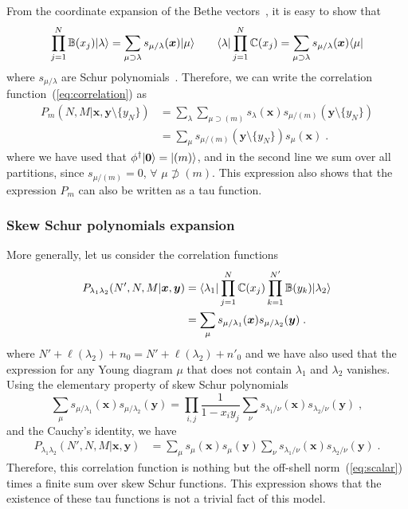 \documentclass[a4paper,11pt]{amsart}
\begin{document}
From the coordinate expansion of the Bethe
vectors~\cite{Bogoliubov2005, Tsilevich:2006}, it is easy to show that
\begin{equation}
\prod_{j=1}^N \mathbb{B}(x_j)\lvert\lambda\rangle  = \sum_{\mu \supset \lambda } s_{\mu/\lambda}(\bm{x})\lvert\mu\rangle\qquad 
 \langle\lambda\rvert \prod_{j=1}^N \mathbb{C}(x_j) = \sum_{\mu \supset \lambda } s_{\mu/\lambda}(\bm{x})\langle\mu\rvert
\end{equation}
where \(s_{\mu/\lambda}\) are Schur polynomials~\cite{Macdonald:1998}.
Therefore, we can write the correlation function~(\ref{eq:correlation}) as 
\begin{equation}
\begin{split}
  P_m(N, M|\bm{x}, \bm{y}\setminus \{y_N\})
  & = \sum_\lambda \sum_{\mu \supset (m)} s_{\lambda}(\bm{x}) s_{\mu/(m)}(\bm{y}\setminus\{y_N\})\\
  & = \sum_\mu s_{\mu/(m)}(\bm{y}\setminus\{y_N\}) s_{\mu}(\bm{x})\; .
\end{split}
\end{equation}
where we have used that \(\phi^\dagger \lvert\bm{0}\rangle = \lvert(m)\rangle\), and in the second line
we sum over all partitions, since \(s_{\mu/(m)} = 0\), \(\forall \) \(\mu \not \supset (m)\).
This expression also shows that the expression \(P_m\) can also be written as a tau function. 

\subsubsection{Skew Schur polynomials expansion}
More generally, let us consider the correlation functions 
\begin{equation}
\begin{split}
  P_{\lambda_1 \lambda_2}(N', N, M|\bm{x}, \bm{y}) & =
  \langle\lambda_1\rvert \prod_{j=1}^N \mathbb{C}(x_j)
  \prod_{k=1}^{N'} \mathbb{B}(y_k)\lvert\lambda_2\rangle \\
  & = \sum_{\mu} s_{\mu/\lambda_1}(\bm{x}) s_{\mu/\lambda_2}(\bm{y}) \; .
\end{split}
\end{equation}
where \(N' + \ell(\lambda_2) + n_0 = N' + \ell(\lambda_2) + n'_0\) and 
we have also used that the expression for any Young diagram
\(\mu\) that does not contain \(\lambda_1\) and \(\lambda_2\)
vanishes. Using the elementary property of skew Schur
polynomials~\cite{Macdonald:1998}
\begin{equation}
  \sum_{\mu} s_{\mu/\lambda_1}(\bm{x}) s_{\mu/\lambda_2}(\bm{y}) = \prod_{i,j}\frac{1}{1 - x_i y_j}
 \sum_\nu s_{\lambda_1/\nu}(\bm{x}) s_{\lambda_2/\nu}(\bm{y})\; ,
\end{equation}
and the Cauchy's identity, we have 
\begin{equation}
\begin{split}
  P_{\lambda_1 \lambda_2}(N', N, M|\bm{x}, \bm{y}) & =
 \sum_\mu s_{\mu}(\bm{x}) s_{\mu}(\bm{y})
 \sum_\nu s_{\lambda_1/\nu}(\bm{x}) s_{\lambda_2/\nu}(\bm{y})\; .
\end{split}
\end{equation}
Therefore, this correlation function is nothing but the off-shell
norm~(\ref{eq:scalar}) times a finite sum over skew Schur functions.
This expression shows that the existence of these tau functions is not
a trivial fact of this model.
\end{document}
